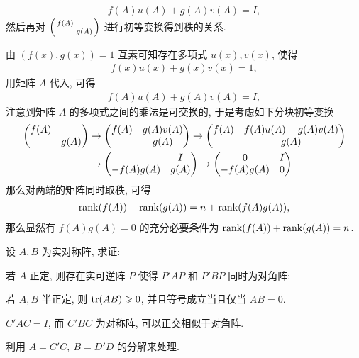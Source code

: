 \begin{exercise}[series=exer]
\begin{hint}
\begin{align*}
            f(A)u(A) + g(A)v(A) = I,
        \end{align*}
        然后再对 $ \smqty(f(A) & \\ & g(A)) $ 进行初等变换得到秩的关系.
    \end{hint}
    \begin{answer}
        由 $ (f(x), g(x)) = 1 $ 互素可知存在多项式 $ u(x), v(x) $, 使得
        \begin{align*}
            f(x)u(x) + g(x)v(x) = 1,
        \end{align*}
        用矩阵 $ A $ 代入, 可得
        \begin{align*}
            f(A)u(A) + g(A)v(A) = I,
        \end{align*}
        注意到矩阵 $ A $ 的多项式之间的乘法是可交换的, 于是考虑如下分块初等变换
        \begin{align*}
            \mqty(f(A) & \\ & g(A)) & \rightarrow \mqty(f(A) & g(A)v(A) \\ & g(A)) \rightarrow \mqty(f(A) & f(A)u(A) + g(A)v(A) \\ & g(A)) \\
                                    & \rightarrow \mqty( & I \\ -f(A)g(A) & g(A)) \rightarrow \mqty( 0 & I \\ -f(A)g(A) & 0 )
        \end{align*}
        那么对两端的矩阵同时取秩, 可得
        \begin{align*}
            \rank(f(A)) + \rank(g(A)) = n + \rank(f(A)g(A)),
        \end{align*}
        那么显然有 $ f(A)g(A) = 0 $ 的充分必要条件为 $ \rank(f(A)) + \rank(g(A)) = n $.
    \end{answer}
    \item 设 $ A, B $ 为实对称阵, 求证:
    \begin{exercise}
        \item 若 $ A $ 正定, 则存在实可逆阵 $ P $ 使得 $ P'AP $ 和 $ P'BP $ 同时为对角阵;
        \item 若 $ A, B $ 半正定, 则 $ \tr(AB) \geqslant 0 $, 并且等号成立当且仅当 $ AB = 0 $.
    \end{exercise}
    \begin{hint}
        \begin{hintsheet}
            \item $ C'AC = I $, 而 $ C'BC $ 为对称阵, 可以正交相似于对角阵.
            \item 利用 $ A = C'C,\ B = D'D $ 的分解来处理.

\end{hintsheet}
\end{hint}
\end{exercise}
